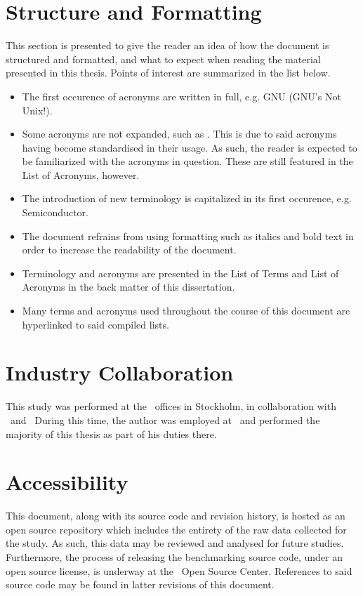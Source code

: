 \section*{Structure and Formatting}
\label{sec:preface_structureandformatting}
This section is presented to give the reader an idea of how the document is structured and formatted, and what to expect when reading the material presented in this thesis.
Points of interest are summarized in the list below.
\begin{itemize}[noitemsep]
	\item The first occurence of acronyms are written in full, e.g. GNU (GNU's Not Unix!).
	\item Some acronyms are not expanded, such as \dvttermcpu . This is due to said acronyms having become standardised in their usage. As such, the reader is expected to be familiarized with the acronyms in question. These are still featured in the List of Acronyms, however. 
	\item The introduction of new terminology is capitalized in its first occurence, e.g. Semiconductor.
	\item The document refrains from using formatting such as italics and bold text in order to increase the readability of the document.
	\item Terminology and acronyms are presented in the List of Terms and List of Acronyms in the back matter of this dissertation.
	\item Many terms and acronyms used throughout the course of this document are hyperlinked to said compiled lists.
\end{itemize}

\section*{Industry Collaboration}
\label{sec:preface_industrycollaboration}
This study was performed at the \dvttermintel\ offices in Stockholm, in collaboration with \dvttermintel\ and \dvttermwindriver\
During this time, the author was employed at \dvttermintel\ and performed the majority of this thesis as part of his duties there.

\section*{Accessibility}
\label{sec:preface_accessibility}
This document, along with its source code and revision history, is hosted as an open source repository which includes the entirety of the raw data collected for the study.
As such, this data may be reviewed and analysed for future studies.
Furthermore, the process of releasing the benchmarking source code, under an open source license, is underway at the \dvttermintel\ Open Source Center.
References to said source code may be found in latter revisions of this document.

